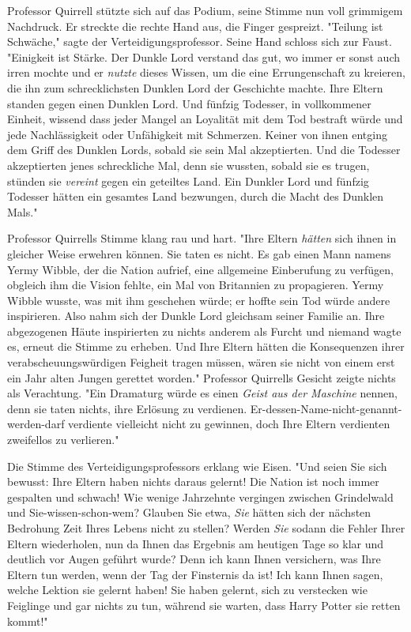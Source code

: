 {Professor Quirrell stützte sich auf das Podium, seine Stimme nun voll grimmigem Nachdruck. Er streckte die rechte Hand aus, die Finger gespreizt. "Teilung ist Schwäche," sagte der Verteidigungsprofessor. Seine Hand schloss sich zur Faust. "Einigkeit ist Stärke. Der Dunkle Lord verstand das gut, wo immer er sonst auch irren mochte und er \emph{nutzte} dieses Wissen, um die eine Errungenschaft zu kreieren, die ihn zum schrecklichsten Dunklen Lord der Geschichte machte. Ihre Eltern standen gegen einen Dunklen Lord. Und fünfzig Todesser, in vollkommener Einheit, wissend dass jeder Mangel an Loyalität mit dem Tod bestraft würde und jede Nachlässigkeit oder Unfähigkeit mit Schmerzen. Keiner von ihnen entging dem Griff des Dunklen Lords, sobald sie sein Mal akzeptierten. Und die Todesser akzeptierten jenes schreckliche Mal, denn sie wussten, sobald sie es trugen, stünden sie \emph{vereint} gegen ein geteiltes Land. Ein Dunkler Lord und fünfzig Todesser hätten ein gesamtes Land bezwungen, durch die Macht des Dunklen Mals."

Professor Quirrells Stimme klang rau und hart. "Ihre Eltern \emph{hätten} sich ihnen in gleicher Weise erwehren können. Sie taten es nicht. Es gab einen Mann namens Yermy Wibble, der die Nation aufrief, eine allgemeine Einberufung zu verfügen, obgleich ihm die Vision fehlte, ein Mal von Britannien zu propagieren. Yermy Wibble wusste, was mit ihm geschehen würde; er hoffte sein Tod würde andere inspirieren. Also nahm sich der Dunkle Lord gleichsam seiner Familie an. Ihre abgezogenen Häute inspirierten zu nichts anderem als Furcht und niemand wagte es, erneut die Stimme zu erheben. Und Ihre Eltern hätten die Konsequenzen ihrer verabscheuungswürdigen Feigheit tragen müssen, wären sie nicht von einem erst ein Jahr alten Jungen gerettet worden." Professor Quirrells Gesicht zeigte nichts als Verachtung. "Ein Dramaturg würde es einen \emph{Geist aus der Maschine} nennen, denn sie taten nichts, ihre Erlösung zu verdienen. Er-dessen-Name-nicht-genannt-werden-darf verdiente vielleicht nicht zu gewinnen, doch Ihre Eltern verdienten zweifellos zu verlieren."

Die Stimme des Verteidigungsprofessors erklang wie Eisen. "Und seien Sie sich bewusst: Ihre Eltern haben nichts daraus gelernt! Die Nation ist noch immer gespalten und schwach! Wie wenige Jahrzehnte vergingen zwischen Grindelwald und Sie-wissen-schon-wem? Glauben Sie etwa, \emph{Sie} hätten sich der nächsten Bedrohung Zeit Ihres Lebens nicht zu stellen? Werden \emph{Sie} sodann die Fehler Ihrer Eltern wiederholen, nun da Ihnen das Ergebnis am heutigen Tage so klar und deutlich vor Augen geführt wurde? Denn ich kann Ihnen versichern, was Ihre Eltern tun werden, wenn der Tag der Finsternis da ist! Ich kann Ihnen sagen, welche Lektion sie gelernt haben! Sie haben gelernt, sich zu verstecken wie Feiglinge und gar nichts zu tun, während sie warten, dass Harry Potter sie retten kommt!"

}
